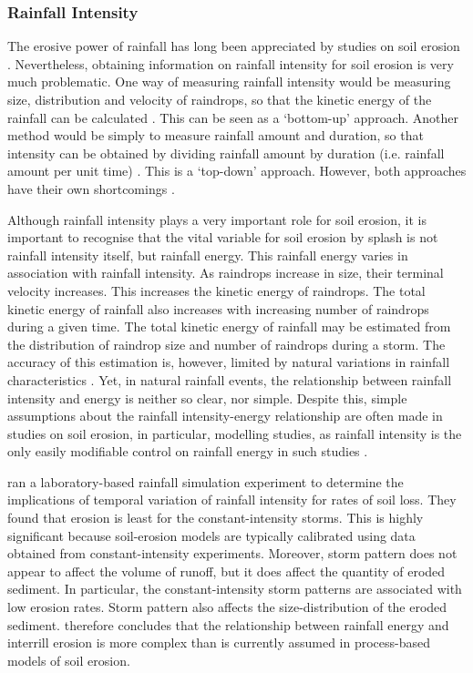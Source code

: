 \subsubsection{Rainfall Intensity} %
\label{sec:RainfallIntensity}

The erosive power of rainfall has long been appreciated by studies on soil
erosion \citep{musgrave1947-133,wischmeier1958-rainfall}. Nevertheless,
obtaining information on rainfall intensity for soil erosion is very much
problematic. One way of measuring rainfall intensity would be measuring size,
distribution and velocity of raindrops, so that the kinetic energy of the
rainfall can be calculated \citep{cerda1997-169,lascelles2000-709}. This can be
seen as a `bottom-up' approach. Another method would be simply to measure
rainfall amount and duration, so that intensity can be obtained by dividing
rainfall amount by duration (i.e. rainfall amount per unit time)
\citep{osborn1998-505}. This is a `top-down' approach. However, both approaches
have their own shortcomings
\citep{parsons2000-723,schuur2001-1019,garcia2001-675}.

Although rainfall intensity plays a very important role for soil erosion, it is
important to recognise that the vital variable for soil erosion by splash is not
rainfall intensity itself, but rainfall energy. This rainfall energy varies in
association with rainfall intensity. As raindrops increase in size, their
terminal velocity increases. This increases the kinetic energy of raindrops. The
total kinetic energy of rainfall also increases with increasing number of
raindrops during a given time. The total kinetic energy of rainfall may be
estimated from the distribution of raindrop size and number of raindrops during
a storm. The accuracy of this estimation is, however, limited by natural
variations in rainfall characteristics \citep{vandijk2002-1}. Yet, in natural
rainfall events, the relationship between rainfall intensity and energy is
neither so clear, nor simple. Despite this, simple assumptions about the
rainfall intensity-energy relationship are often made in studies on soil
erosion, in particular, modelling studies, as rainfall intensity is the
only easily modifiable control on rainfall energy in such studies
\citep{laflen1997-96,morgan1998-389}.

\citet{parsons2006-68} ran a laboratory-based rainfall simulation
experiment to determine the implications of temporal variation of rainfall
intensity for rates of soil loss. They found that erosion is least for the
constant-intensity storms. This is highly significant because soil-erosion
models are typically calibrated using data obtained from constant-intensity
experiments. Moreover, storm pattern does not appear to affect the volume of
runoff, but it does affect the quantity of eroded sediment. In particular, the
constant-intensity storm patterns are associated with low erosion rates. Storm
pattern also affects the size-distribution of the eroded sediment.
\citet{parsons2006-68} therefore concludes that the relationship between
rainfall energy and interrill erosion is more complex than is currently assumed
in process-based models of soil erosion.

